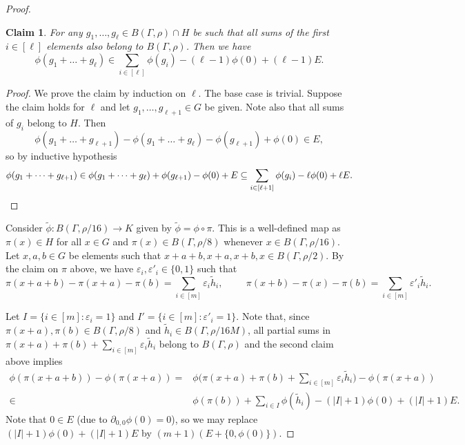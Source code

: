 \documentclass[a4paper,11pt]{article}
\numberwithin{theorem}{section}
\newtheorem*{claim*}{Claim}
\theoremstyle{definition}
\begin{document}
\begin{proof}
    \begin{claim*}
        For any $g_1, \dots, g_\ell \in B(\Gamma, \rho) \cap H$ be such that all sums of the first $i \in [\ell]$ elements also belong to $B(\Gamma, \rho)$. Then we have
        \[\phi(g_1 + \dots + g_\ell) \in \sum_{i \in [\ell]} \phi(g_i) - (\ell - 1) \phi(0) + (\ell - 1) E.\]
    \end{claim*}
 
    \begin{proof}
        We prove the claim by induction on $\ell$. The base case is trivial. Suppose the claim holds for $\ell$ and let $g_1, \dots, g_{\ell + 1} \in G$ be given. Note also that all sums of $g_i$ belong to $H$. Then
        \[\phi(g_1 + \dots + g_{\ell + 1}) - \phi(g_1 + \dots + g_{\ell}) - \phi(g_{\ell + 1}) + \phi(0) \in E,\]
        so by inductive hypothesis
        \[\phi(g_1 + \dots + g_{\ell + 1}) \in \phi(g_1 + \dots + g_{\ell}) + \phi(g_{\ell + 1}) - \phi(0) + E \subseteq \sum_{i \in [\ell+1]} \phi(g_i) - \ell \phi(0) + \ell E.\qedhere\]
    \end{proof}

    Consider $\tilde{\phi} : B(\Gamma, \rho / 16) \to K$ given by $\tilde{\phi} = \phi \circ \pi$. This is a well-defined map as $\pi(x) \in H$ for all $x \in G$ and $\pi(x) \in B(\Gamma, \rho / 8)$ whenever $x \in B(\Gamma, \rho/16)$. Let $x, a, b \in G$ be elements such that $x + a + b, x + a, x + b, x \in B(\Gamma, \rho / 2)$. By the claim on $\pi$ above, we have $\varepsilon_i, \varepsilon'_i \in \{0,1\}$ such that
    \[\pi(x  +a + b) -\pi(x+a) - \pi(b) = \sum_{i \in [m]} \varepsilon_i \tilde{h}_i,\hspace{1cm} \pi(x + b) -\pi(x) - \pi(b) = \sum_{i \in [m]} \varepsilon'_i \tilde{h}_i.\]

    Let $I = \{i \in [m] : \varepsilon_i = 1\}$ and $I' = \{i \in [m] : \varepsilon'_i = 1\}$. Note that, since $\pi(x + a) , \pi(b) \in B(\Gamma, \rho / 8)$ and $\tilde{h}_i \in B(\Gamma, \rho / 16M)$, all partial sums in $\pi(x + a) + \pi(b) + \sum_{i \in [m]} \varepsilon_i \tilde{h}_i$ belong to $B(\Gamma, \rho)$ and the second claim above implies
    \begin{align*}\phi(\pi(x  +a + b)) - \phi(\pi(x  + a)) = &\phi\Big(\pi(x + a) + \pi(b) + \sum_{i \in [m]} \varepsilon_i \tilde{h}_i\Big) - \phi(\pi(x  + a)) \\
    \in &\phi(\pi(b)) + \sum_{i \in I} \phi(\tilde{h}_i) - (|I| + 1)\phi(0) + (|I|  + 1) E.\end{align*}
    Note that $0 \in E$ (due to $\partial_{0,0}\phi(0) = 0$), so we may replace $(|I|  + 1)\phi(0) + (|I|  + 1) E$ by $(m+1) (E + \{0, \phi(0)\})$.
    

\end{proof}
\end{document}
